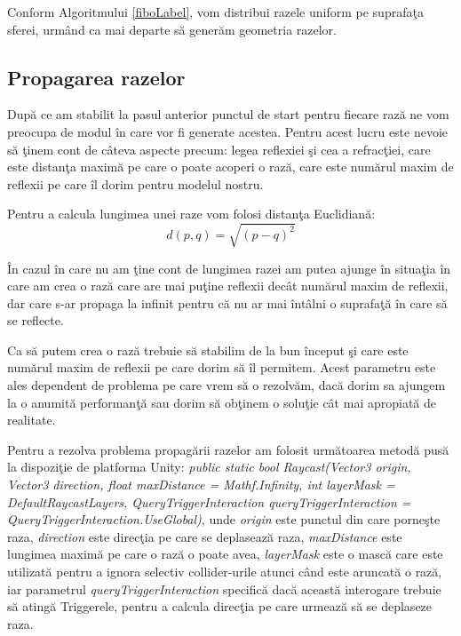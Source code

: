 	Conform Algoritmului \ref{fiboLabel}, vom distribui razele uniform pe suprafa\c{t}a sferei, urm\^{a}nd ca mai departe s\u{a} gener\u{a}m geometria razelor.
	
\subsection{Propagarea razelor}

	Dup\u{a} ce am stabilit la pasul anterior punctul de start pentru fiecare raz\u{a} ne vom preocupa de modul \^{i}n care vor fi generate acestea. Pentru acest lucru este nevoie s\u{a} \c{t}inem cont de c\^{a}teva aspecte precum: legea reflexiei \c{s}i cea a refrac\c{t}iei, care este distan\c{t}a maxim\u{a} pe care o poate acoperi o raz\u{a}, care este num\u{a}rul maxim de reflexii pe care \^{i}l dorim pentru modelul nostru.
	\bigskip
	
	Pentru a calcula lungimea unei raze vom folosi distan\c{t}a Euclidian\u{a}:
	\begin{equation}
		d(p,q) = \sqrt{(p-q)^2}
	\end{equation}

	\^{I}n cazul \^{i}n care nu am \c{t}ine cont de lungimea razei am putea ajunge \^{i}n situa\c{t}ia \^{i}n care am crea o raz\u{a} care are mai pu\c{t}ine reflexii dec\^{a}t num\u{a}rul maxim de reflexii, dar care s-ar propaga la infinit pentru c\u{a} nu ar mai \^{i}nt\^{a}lni o suprafa\c{t}\u{a} \^{i}n care s\u{a} se reflecte.
	
	\bigskip
	Ca s\u{a} putem crea o raz\u{a} trebuie s\u{a} stabilim de la bun \^{i}nceput \c{s}i care este num\u{a}rul maxim de reflexii pe care dorim s\u{a} \^{i}l permitem. Acest parametru este ales dependent de problema pe care vrem s\u{a} o rezolv\u{a}m, dac\u{a} dorim sa ajungem la o anumit\u{a} performan\c{t}\u{a} sau dorim s\u{a} ob\c{t}inem o solu\c{t}ie c\^{a}t mai apropiat\u{a} de realitate.
	
	\bigskip
	Pentru a rezolva problema propag\u{a}rii razelor am folosit urm\u{a}toarea metod\u{a} pus\u{a} la dispozi\c{t}ie de platforma Unity: \textit{public static bool Raycast(Vector3 origin, Vector3 direction, float maxDistance = Mathf.Infinity, int layerMask = DefaultRaycastLayers, QueryTriggerInteraction queryTriggerInteraction = QueryTriggerInteraction.UseGlobal)}, unde \textit{origin} este punctul din care porne\c{s}te raza, \textit{direction} este direc\c{t}ia pe care se deplaseaz\u{a} raza, \textit{maxDistance} este lungimea maxim\u{a} pe care o raz\u{a} o poate avea, \textit{layerMask} este o mască care este utilizată pentru a ignora selectiv collider-urile atunci când este aruncat\u{a} o rază, iar parametrul \textit{queryTriggerInteraction} specific\u{a} dacă această interogare trebuie să atingă Triggerele, pentru a calcula direc\c{t}ia pe care urmeaz\u{a} s\u{a} se deplaseze raza\cite{raycast}.
	\bigskip
	
